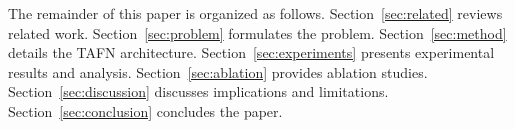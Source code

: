 The remainder of this paper is organized as follows. Section~\ref{sec:related} reviews related work. Section~\ref{sec:problem} formulates the problem. Section~\ref{sec:method} details the TAFN architecture. Section~\ref{sec:experiments} presents experimental results and analysis. Section~\ref{sec:ablation} provides ablation studies. Section~\ref{sec:discussion} discusses implications and limitations. Section~\ref{sec:conclusion} concludes the paper.
